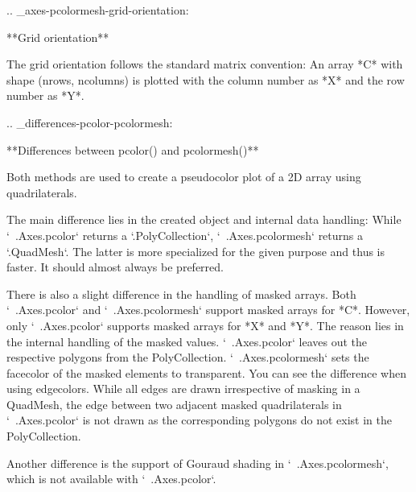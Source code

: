 \begin{DoxyVerb}
\begin{DoxyVerb}
.. _axes-pcolormesh-grid-orientation:

**Grid orientation**

The grid orientation follows the standard matrix convention: An array
*C* with shape (nrows, ncolumns) is plotted with the column number as
*X* and the row number as *Y*.

.. _differences-pcolor-pcolormesh:

**Differences between pcolor() and pcolormesh()**

Both methods are used to create a pseudocolor plot of a 2D array
using quadrilaterals.

The main difference lies in the created object and internal data
handling:
While `~.Axes.pcolor` returns a `.PolyCollection`, `~.Axes.pcolormesh`
returns a `.QuadMesh`. The latter is more specialized for the given
purpose and thus is faster. It should almost always be preferred.

There is also a slight difference in the handling of masked arrays.
Both `~.Axes.pcolor` and `~.Axes.pcolormesh` support masked arrays
for *C*. However, only `~.Axes.pcolor` supports masked arrays for *X*
and *Y*. The reason lies in the internal handling of the masked values.
`~.Axes.pcolor` leaves out the respective polygons from the
PolyCollection. `~.Axes.pcolormesh` sets the facecolor of the masked
elements to transparent. You can see the difference when using
edgecolors. While all edges are drawn irrespective of masking in a
QuadMesh, the edge between two adjacent masked quadrilaterals in
`~.Axes.pcolor` is not drawn as the corresponding polygons do not
exist in the PolyCollection.

Another difference is the support of Gouraud shading in
`~.Axes.pcolormesh`, which is not available with `~.Axes.pcolor`.\end{DoxyVerb}
 \mbox{\label{classmatplotlib_1_1axes_1_1__axes_1_1Axes_af24c675aa7c08386385a740044392443}} 

\end{DoxyVerb}
